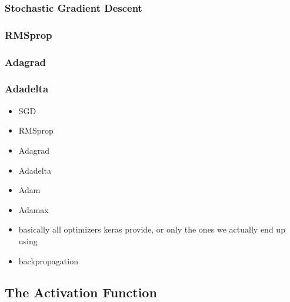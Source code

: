 \subsubsection{Stochastic Gradient Descent}

\subsubsection{RMSprop}
\subsubsection{Adagrad}
\subsubsection{Adadelta}

\begin{itemize}
    \item SGD
    \item RMSprop
    \item Adagrad
    \item Adadelta
    \item Adam
    \item Adamax
    \item basically all optimizers keras provide, or only the ones we actually end up using
\end{itemize}

\begin{itemize}
    \item backpropagation
\end{itemize}

\subsection{The Activation Function}

